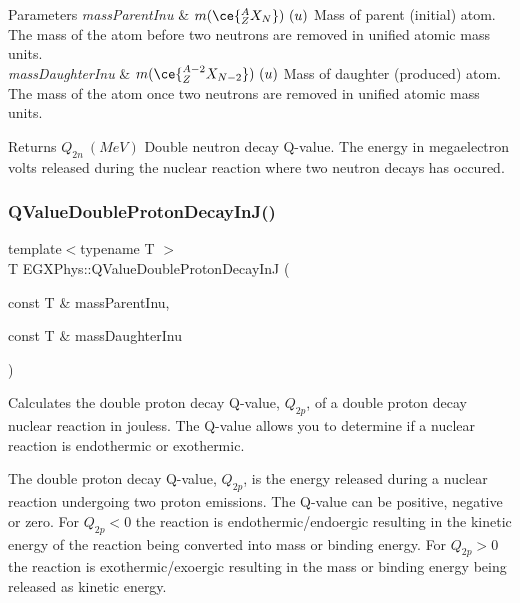 \begin{DoxyParams}{Parameters}
{\em mass\+Parent\+Inu} & $m(\ce{ ^{A}_{Z}X_{N} })\ (u)$ Mass of parent (initial) atom. The mass of the atom before two neutrons are removed in unified atomic mass units. \\
\hline
{\em mass\+Daughter\+Inu} & $m(\ce{ ^{A-2}_{Z}X_{N-2} })\ (u)$ Mass of daughter (produced) atom. The mass of the atom once two neutrons are removed in unified atomic mass units. \\
\hline
\end{DoxyParams}
\begin{DoxyReturn}{Returns}
$Q_{2n}\ (MeV)$ Double neutron decay Q-\/value. The energy in megaelectron volts released during the nuclear reaction where two neutron decays has occured. 
\end{DoxyReturn}
\mbox{\label{group___q_value_ga64a3867f65de5586feab99527bb03d31}} 
\subsubsection{\texorpdfstring{Q\+Value\+Double\+Proton\+Decay\+In\+J()}{QValueDoubleProtonDecayInJ()}}
{\footnotesize\ttfamily template$<$typename T $>$ \\
T E\+G\+X\+Phys\+::\+Q\+Value\+Double\+Proton\+Decay\+InJ (\begin{DoxyParamCaption}\item[{const T \&}]{mass\+Parent\+Inu,  }\item[{const T \&}]{mass\+Daughter\+Inu }\end{DoxyParamCaption})}



Calculates the double proton decay Q-\/value, $Q_{2p}$, of a double proton decay nuclear reaction in jouless. The Q-\/value allows you to determine if a nuclear reaction is endothermic or exothermic. 

The double proton decay Q-\/value, $Q_{2p}$, is the energy released during a nuclear reaction undergoing two proton emissions. The Q-\/value can be positive, negative or zero. For $Q_{2p} < 0$ the reaction is endothermic/endoergic resulting in the kinetic energy of the reaction being converted into mass or binding energy. For $Q_{2p} > 0$ the reaction is exothermic/exoergic resulting in the mass or binding energy being released as kinetic energy.

